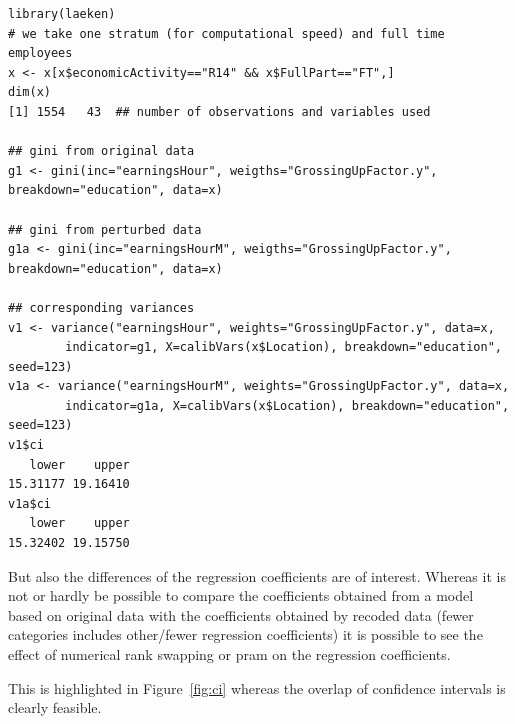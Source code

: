 \documentclass[12pt]{article}
\begin{document}
\begin{lstlisting}[frame=single, label=listing:ci, caption={Overlap in confidence intervals from estimates based on perturbed and original data.}] 
library(laeken)
# we take one stratum (for computational speed) and full time employees
x <- x[x$economicActivity=="R14" && x$FullPart=="FT",]
dim(x)
[1] 1554   43  ## number of observations and variables used

## gini from original data
g1 <- gini(inc="earningsHour", weigths="GrossingUpFactor.y", breakdown="education", data=x) 

## gini from perturbed data
g1a <- gini(inc="earningsHourM", weigths="GrossingUpFactor.y", breakdown="education", data=x) 

## corresponding variances
v1 <- variance("earningsHour", weights="GrossingUpFactor.y", data=x, 
		indicator=g1, X=calibVars(x$Location), breakdown="education", seed=123)
v1a <- variance("earningsHourM", weights="GrossingUpFactor.y", data=x, 
		indicator=g1a, X=calibVars(x$Location), breakdown="education", seed=123)	
v1$ci
   lower    upper 
15.31177 19.16410 
v1a$ci
   lower    upper 
15.32402 19.15750 
\end{lstlisting}

But also the differences of the regression coefficients are of interest. Whereas it is not or hardly be possible 
to compare the coefficients obtained from a model based on original data with the coefficients obtained by
recoded data (fewer categories includes other/fewer regression coefficients) it is possible to see the effect of numerical
rank swapping or pram on the regression coefficients.

This is highlighted in Figure~\ref{fig:ci} whereas the overlap of confidence intervals is clearly feasible.
\end{document}
